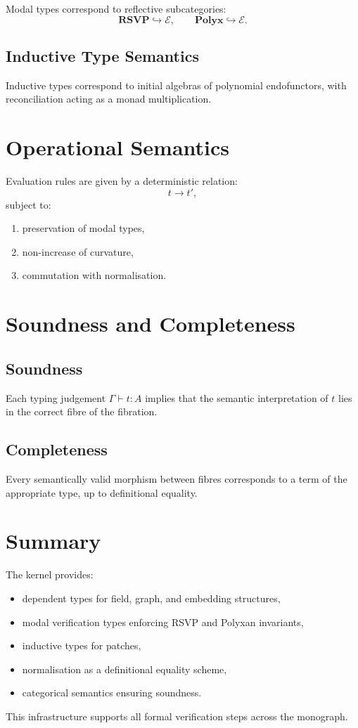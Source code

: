 Modal types correspond to reflective subcategories:
\[
\mathbf{RSVP} \hookrightarrow \mathcal{E}, \qquad
\mathbf{Polyx} \hookrightarrow \mathcal{E}.
\]

\subsection{Inductive Type Semantics}

Inductive types correspond to initial algebras of polynomial endofunctors, with reconciliation acting as a monad multiplication.

\section{Operational Semantics}

Evaluation rules are given by a deterministic relation:
\[
t \longrightarrow t',
\]
subject to:
\begin{enumerate}
\item preservation of modal types,
\item non-increase of curvature,
\item commutation with normalisation.
\end{enumerate}

\section{Soundness and Completeness}

\subsection{Soundness}

Each typing judgement $\Gamma \vdash t : A$ implies that the semantic interpretation of $t$ lies in the correct fibre of the fibration.

\subsection{Completeness}

Every semantically valid morphism between fibres corresponds to a term of the appropriate type, up to definitional equality.

\section{Summary}

The kernel provides:
\begin{itemize}
\item dependent types for field, graph, and embedding structures,
\item modal verification types enforcing RSVP and Polyxan invariants,
\item inductive types for patches,
\item normalisation as a definitional equality scheme,
\item categorical semantics ensuring soundness.
\end{itemize}

This infrastructure supports all formal verification steps across the monograph.

